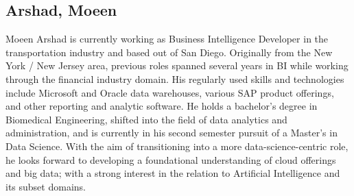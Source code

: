 \subsection{Arshad, Moeen}
Moeen Arshad is currently working as Business Intelligence Developer in the 
transportation industry and based out of San Diego. Originally from the 
New York / New Jersey area, previous roles spanned several years in BI while 
working through the financial industry domain. His regularly used skills and 
technologies include Microsoft and Oracle data warehouses, various SAP product 
offerings, and other reporting and analytic software. He holds a bachelor's degree 
in Biomedical Engineering, shifted into the field of data analytics and administration, 
and is currently in his second semester pursuit of a Master's in Data Science. 
With the aim of transitioning into a more data-science-centric role, he looks forward 
to developing a foundational understanding of cloud offerings and big data; with a 
strong interest in the relation to Artificial Intelligence and its subset domains.
